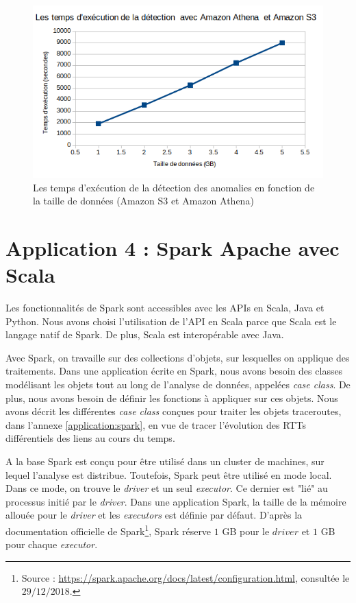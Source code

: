 \begin{figure}[H]
	\centering
	\captionsetup{justification=centering}
	\includegraphics[width=0.7\linewidth]{illustrations/temps-avec-aws_1}
	\caption{Les temps d'exécution de la détection des anomalies en fonction de la taille de données (Amazon S3 et Amazon Athena)}
	\label{fig:temps-avec-aws}
\end{figure}


\section{Application 4 : Spark Apache avec Scala}

Les fonctionnalités de Spark sont accessibles avec les  APIs en Scala, Java et Python. Nous avons choisi l'utilisation de l'API en Scala parce que Scala est le langage natif de Spark. De plus, Scala est interopérable avec Java.  

Avec Spark, on travaille sur des collections d'objets, sur lesquelles on applique des traitements. Dans une application écrite en Spark, nous avons besoin des classes modélisant les objets tout au long de l'analyse de données, appelées \textit{case class}. De plus, nous avons besoin de définir les fonctions à appliquer  sur ces objets. Nous avons décrit les différentes \textit{case class} conçues pour traiter les objets traceroutes, dans l'annexe \ref{application:spark}, en vue de tracer l'évolution des RTTs différentiels des liens au cours du temps. 

A la base Spark est conçu pour être utilisé dans un cluster de machines, sur  lequel l'analyse est distribue. Toutefois, Spark peut être utilisé en mode local. Dans ce mode, on trouve le \textit{driver} et un seul \textit{executor}. Ce dernier est "lié" au processus initié par le \textit{driver}. 
Dans une application Spark, la taille de la mémoire allouée pour le \textit{driver} et les \textit{executors} est  définie par défaut. D'après la documentation officielle de Spark\footnote{Source : \url{https://spark.apache.org/docs/latest/configuration.html}, consultée le $29/12/2018$.}, Spark réserve $ 1 $ GB pour le $ driver $ et $ 1 $ GB pour chaque \textit{executor}. 



